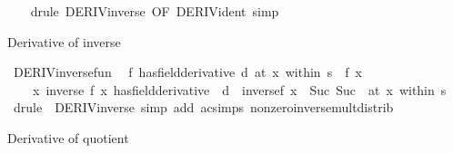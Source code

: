 \begin{isabellebody}
%
\isadelimproof
\ \ %
\endisadelimproof
%
\isatagproof
{}\isamarkupfalse%
\ {\isacharparenleft}{\kern0pt}drule\ DERIV{\isacharunderscore}{\kern0pt}inverse{\isacharprime}{\kern0pt}\ {\isacharbrackleft}{\kern0pt}OF\ DERIV{\isacharunderscore}{\kern0pt}ident{\isacharbrackright}{\kern0pt}{\isacharparenright}{\kern0pt}\ simp%
\endisatagproof
{\isafoldproof}%
%
\isadelimproof
%
\endisadelimproof
%
\begin{isamarkuptext}%
Derivative of inverse%
\end{isamarkuptext}\isamarkuptrue%
\isamarkupfalse%
\ DERIV{\isacharunderscore}{\kern0pt}inverse{\isacharunderscore}{\kern0pt}fun{\isacharcolon}{\kern0pt}\isanewline
\ \ {\isachardoublequoteopen}{\isacharparenleft}{\kern0pt}f\ has{\isacharunderscore}{\kern0pt}field{\isacharunderscore}{\kern0pt}derivative\ d{\isacharparenright}{\kern0pt}\ {\isacharparenleft}{\kern0pt}at\ x\ within\ s{\isacharparenright}{\kern0pt}\ {\isasymLongrightarrow}\ f\ x\ {\isasymnoteq}\ {}\ {\isasymLongrightarrow}\isanewline
\ \ \ \ {\isacharparenleft}{\kern0pt}{\isacharparenleft}{\kern0pt}{\isasymlambda}x{\isachardot}{\kern0pt}\ inverse\ {\isacharparenleft}{\kern0pt}f\ x{\isacharparenright}{\kern0pt}{\isacharparenright}{\kern0pt}\ has{\isacharunderscore}{\kern0pt}field{\isacharunderscore}{\kern0pt}derivative\ {\isacharparenleft}{\kern0pt}{\isacharminus}{\kern0pt}\ {\isacharparenleft}{\kern0pt}d\ {\isacharasterisk}{\kern0pt}\ inverse{\isacharparenleft}{\kern0pt}f\ x\ {\isacharcircum}{\kern0pt}\ Suc\ {\isacharparenleft}{\kern0pt}Suc\ {}{\isacharparenright}{\kern0pt}{\isacharparenright}{\kern0pt}{\isacharparenright}{\kern0pt}{\isacharparenright}{\kern0pt}{\isacharparenright}{\kern0pt}\ {\isacharparenleft}{\kern0pt}at\ x\ within\ s{\isacharparenright}{\kern0pt}{\isachardoublequoteclose}\isanewline
%
\isadelimproof
\ \ %
\endisadelimproof
%
\isatagproof
{}\isamarkupfalse%
\ {\isacharparenleft}{\kern0pt}drule\ {\isacharparenleft}{\kern0pt}{}{\isacharparenright}{\kern0pt}\ DERIV{\isacharunderscore}{\kern0pt}inverse{\isacharprime}{\kern0pt}{\isacharparenright}{\kern0pt}\ {\isacharparenleft}{\kern0pt}simp\ add{\isacharcolon}{\kern0pt}\ ac{\isacharunderscore}{\kern0pt}simps\ nonzero{\isacharunderscore}{\kern0pt}inverse{\isacharunderscore}{\kern0pt}mult{\isacharunderscore}{\kern0pt}distrib{\isacharparenright}{\kern0pt}%
\endisatagproof
{\isafoldproof}%
%
\isadelimproof
%
\endisadelimproof
%
\begin{isamarkuptext}%
Derivative of quotient%
\end{isamarkuptext}\isamarkuptrue%

\end{isabellebody}
